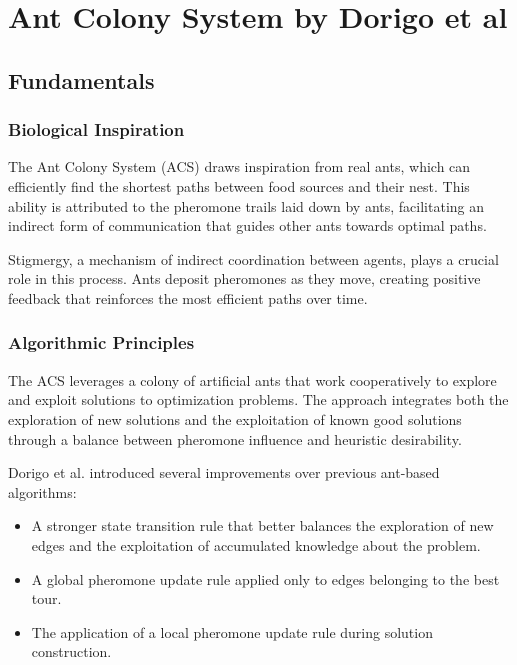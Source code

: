 
%

\chapter{Ant Colony System by Dorigo et al}\label{chapt:5}



\section{Fundamentals}

\subsection{Biological Inspiration}
The Ant Colony System (\Gls{ACS}) draws inspiration from real ants, which can efficiently find the shortest paths between food sources and their nest. This ability is attributed to the pheromone trails laid down by ants, facilitating an indirect form of communication that guides other ants towards optimal paths\cite{Dorigo1996, Dorigo1997}.

Stigmergy, a mechanism of indirect coordination between agents, plays a crucial role in this process\cite{Bonabeau1999}. Ants deposit pheromones as they move, creating positive feedback that reinforces the most efficient paths over time\cite{Deneubourg1990}.

\subsection{Algorithmic Principles}
The \Gls{ACS} leverages a colony of artificial ants that work cooperatively to explore and exploit solutions to optimization problems. The approach integrates both the exploration of new solutions and the exploitation of known good solutions through a balance between pheromone influence and heuristic desirability.\cite{Dorigo1996, Dorigo1997}

Dorigo et al. introduced several improvements over previous ant-based algorithms:

\begin{itemize}
	\item A stronger state transition rule that better balances the exploration of new edges and the exploitation of accumulated knowledge about the problem.
	\item A global pheromone update rule applied only to edges belonging to the best tour.
	\item The application of a local pheromone update rule during solution construction.
\end{itemize}

